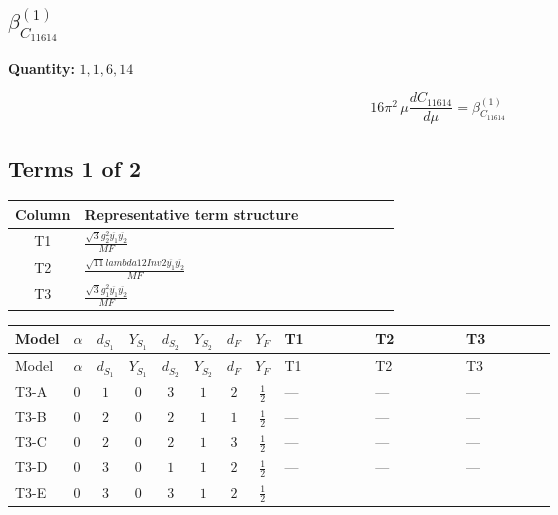 \documentclass[8pt]{article}
\begin{document}
\begin{landscape}
\section*{$\beta_{C_{11614}}^{(1)}$}
\noindent\textbf{Quantity: }$\mathrm{1,1,6,14}$\par\smallskip
\[16\pi^2\,\mu\frac{d C_{11614}}{d\mu}=\beta_{C_{11614}}^{(1)}\]
\subsection*{Terms 1 of 2}
\begin{center}
\begin{tabular}{@{}c >{\raggedright\arraybackslash}p{0.82\linewidth}@{}}
\toprule
Column & Representative term structure \\
\midrule
T1 & \(\displaystyle \frac{\sqrt{3} g_{2}^{2} \overline{y_{1}} \overline{y_{2}}}{MF}\) \\
\midrule
T2 & \(\displaystyle \frac{\sqrt{11} lambda12Inv2 \overline{y_{1}} \overline{y_{2}}}{MF}\) \\
\midrule
T3 & \(\displaystyle \frac{\sqrt{3} g_{1}^{2} \overline{y_{1}} \overline{y_{2}}}{MF}\) \\
\midrule
\bottomrule
\end{tabular}
\end{center}
\smallskip
\tiny
\begin{longtable}{@{}llcccccc >{\raggedright\arraybackslash}p{0.21\linewidth} >{\raggedright\arraybackslash}p{0.21\linewidth} >{\raggedright\arraybackslash}p{0.21\linewidth}@{}}
\toprule
Model & $\alpha$ & $d_{S_1}$ & $Y_{S_1}$ & $d_{S_2}$ & $Y_{S_2}$ & $d_F$ & $Y_F$ & T1 & T2 & T3 \\
\midrule
\endfirsthead
\toprule
Model & $\alpha$ & $d_{S_1}$ & $Y_{S_1}$ & $d_{S_2}$ & $Y_{S_2}$ & $d_F$ & $Y_F$ & T1 & T2 & T3 \\
\midrule
\endhead
T3-A & $0$ & $1$ & $0$ & $3$ & $1$ & $2$ & $\frac{1}{2}$ & --- & --- & --- \\
\midrule
T3-B & $0$ & $2$ & $0$ & $2$ & $1$ & $1$ & $\frac{1}{2}$ & --- & --- & --- \\
\midrule
T3-C & $0$ & $2$ & $0$ & $2$ & $1$ & $3$ & $\frac{1}{2}$ & --- & --- & --- \\
\midrule
T3-D & $0$ & $3$ & $0$ & $1$ & $1$ & $2$ & $\frac{1}{2}$ & --- & --- & --- \\
\midrule
T3-E & $0$ & $3$ & $0$ & $3$ & $1$ & $2$ & $\frac{1}{2}$ & \scriptsize\adjustbox{max width=\linewidth}{$\begin{gathered} - \frac{11 \sqrt{3} g_{2}^{2} \overline{y_{1}} \overline{y_{2}}}{8 MF}\end{gathered}$} & \scriptsize\adjustbox{max width=\linewidth}{$\begin{gathered} - \frac{3 \sqrt{11} lambda12Inv2 \overline{y_{1}} \overline{y_{2}}}{22 MF}\end{gathered}$} & \scriptsize\adjustbox{max width=\linewidth}{$\begin{gathered} - \frac{\sqrt{3} g_{1}^{2} \overline{y_{1}} \overline{y_{2}}}{8 MF}\end{gathered}$} \\

\end{longtable}
\end{landscape}
\end{document}
